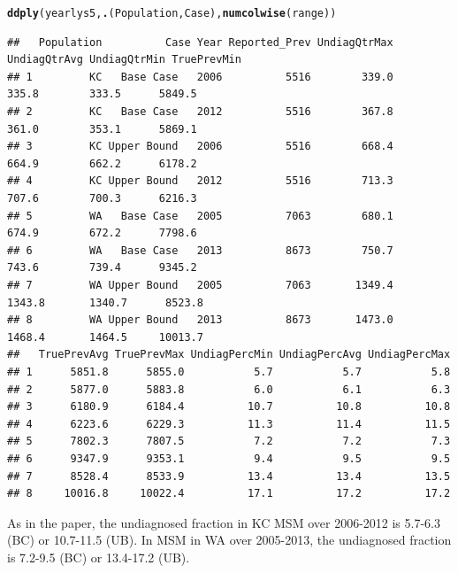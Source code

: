 \documentclass{article}\usepackage[]{graphicx}\usepackage[]{color}
\makeatletter
\newcommand{\hlstd}[1]{\textcolor[rgb]{0.345,0.345,0.345}{#1}}%
\newcommand{\hlkwd}[1]{\textcolor[rgb]{0.737,0.353,0.396}{\textbf{#1}}}%
\newenvironment{kframe}{%
 \def\at@end@of@kframe{}%
 \ifinner\ifhmode%
  \def\at@end@of@kframe{\end{minipage}}%
  \begin{minipage}{\columnwidth}%
 \fi\fi%
 \def\FrameCommand##1{\hskip\@totalleftmargin \hskip-\fboxsep
 \colorbox{shadecolor}{##1}\hskip-\fboxsep
     \hskip-\linewidth \hskip-\@totalleftmargin \hskip\columnwidth}%
 \MakeFramed {\advance\hsize-\width
   \@totalleftmargin\z@ \linewidth\hsize
   \@setminipage}}%
 {\par\unskip\endMakeFramed%
 \at@end@of@kframe}
\newenvironment{knitrout}{}{} %
\makeatother
\begin{document}
\begin{knitrout}\footnotesize
{}\color{fgcolor}\begin{kframe}
\begin{alltt}
\hlkwd{ddply}\hlstd{(yearlys5,} \hlkwd{.}\hlstd{(Population, Case),} \hlkwd{numcolwise}\hlstd{(range))}
\end{alltt}
\begin{verbatim}
##   Population          Case Year Reported_Prev UndiagQtrMax UndiagQtrAvg UndiagQtrMin TruePrevMin
## 1         KC   Base Case   2006          5516        339.0        335.8        333.5      5849.5
## 2         KC   Base Case   2012          5516        367.8        361.0        353.1      5869.1
## 3         KC Upper Bound   2006          5516        668.4        664.9        662.2      6178.2
## 4         KC Upper Bound   2012          5516        713.3        707.6        700.3      6216.3
## 5         WA   Base Case   2005          7063        680.1        674.9        672.2      7798.6
## 6         WA   Base Case   2013          8673        750.7        743.6        739.4      9345.2
## 7         WA Upper Bound   2005          7063       1349.4       1343.8       1340.7      8523.8
## 8         WA Upper Bound   2013          8673       1473.0       1468.4       1464.5     10013.7
##   TruePrevAvg TruePrevMax UndiagPercMin UndiagPercAvg UndiagPercMax
## 1      5851.8      5855.0           5.7           5.7           5.8
## 2      5877.0      5883.8           6.0           6.1           6.3
## 3      6180.9      6184.4          10.7          10.8          10.8
## 4      6223.6      6229.3          11.3          11.4          11.5
## 5      7802.3      7807.5           7.2           7.2           7.3
## 6      9347.9      9353.1           9.4           9.5           9.5
## 7      8528.4      8533.9          13.4          13.4          13.5
## 8     10016.8     10022.4          17.1          17.2          17.2
\end{verbatim}
\end{kframe}
\end{knitrout}


As in the paper, the undiagnosed fraction in KC MSM over 2006-2012 is 5.7-6.3 (BC) or 10.7-11.5 (UB). In MSM in WA over 2005-2013, the undiagnosed fraction is 7.2-9.5 (BC) or 13.4-17.2 (UB). 
\end{document}
